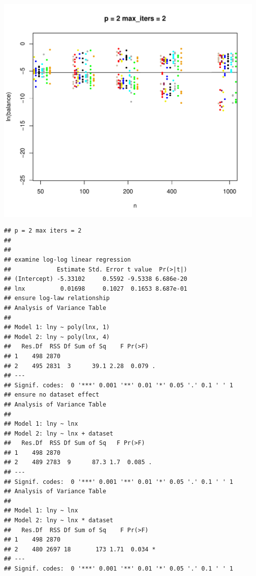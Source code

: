 \documentclass{article}\usepackage[]{graphicx}\usepackage[]{color}
\makeatletter
\def\maxwidth{ %
  \ifdim\Gin@nat@width>\linewidth
    \linewidth
  \else
    \Gin@nat@width
  \fi
}
\newenvironment{kframe}{%
 \def\at@end@of@kframe{}%
 \ifinner\ifhmode%
  \def\at@end@of@kframe{\end{minipage}}%
  \begin{minipage}{\columnwidth}%
 \fi\fi%
 \def\FrameCommand##1{\hskip\@totalleftmargin \hskip-\fboxsep
 \colorbox{shadecolor}{##1}\hskip-\fboxsep
     \hskip-\linewidth \hskip-\@totalleftmargin \hskip\columnwidth}%
 \MakeFramed {\advance\hsize-\width
   \@totalleftmargin\z@ \linewidth\hsize
   \@setminipage}}%
 {\par\unskip\endMakeFramed%
 \at@end@of@kframe}
\newenvironment{knitrout}{}{} %
\makeatother
\begin{document}
\begin{knitrout}
\includegraphics[width=\maxwidth]{figure/load_and_cleanup_data6} 
\begin{kframe}\begin{verbatim}
## p = 2 max iters = 2 
## 
## 
## examine log-log linear regression
##             Estimate Std. Error t value  Pr(>|t|)
## (Intercept) -5.33102     0.5592 -9.5338 6.686e-20
## lnx          0.01698     0.1027  0.1653 8.687e-01
## ensure log-law relationship
## Analysis of Variance Table
## 
## Model 1: lny ~ poly(lnx, 1)
## Model 2: lny ~ poly(lnx, 4)
##   Res.Df  RSS Df Sum of Sq    F Pr(>F)  
## 1    498 2870                           
## 2    495 2831  3      39.1 2.28  0.079 .
## ---
## Signif. codes:  0 '***' 0.001 '**' 0.01 '*' 0.05 '.' 0.1 ' ' 1
## ensure no dataset effect
## Analysis of Variance Table
## 
## Model 1: lny ~ lnx
## Model 2: lny ~ lnx + dataset
##   Res.Df  RSS Df Sum of Sq   F Pr(>F)  
## 1    498 2870                          
## 2    489 2783  9      87.3 1.7  0.085 .
## ---
## Signif. codes:  0 '***' 0.001 '**' 0.01 '*' 0.05 '.' 0.1 ' ' 1
## Analysis of Variance Table
## 
## Model 1: lny ~ lnx
## Model 2: lny ~ lnx * dataset
##   Res.Df  RSS Df Sum of Sq    F Pr(>F)  
## 1    498 2870                           
## 2    480 2697 18       173 1.71  0.034 *
## ---
## Signif. codes:  0 '***' 0.001 '**' 0.01 '*' 0.05 '.' 0.1 ' ' 1
\end{verbatim}
\end{kframe}

\end{knitrout}
\end{document}

